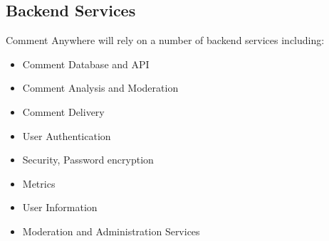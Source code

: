 \documentclass[proposal.tex]{subfiles}
\begin{document}
\subsection{Backend Services}

Comment Anywhere will rely on a number of backend services including:

\begin{itemize}
    \item Comment Database and API
    \item Comment Analysis and Moderation
    \item Comment Delivery
    \item User Authentication
    \item Security, Password encryption
    \item Metrics
    \item User Information
    \item Moderation and Administration Services
\end{itemize}
\end{document}
